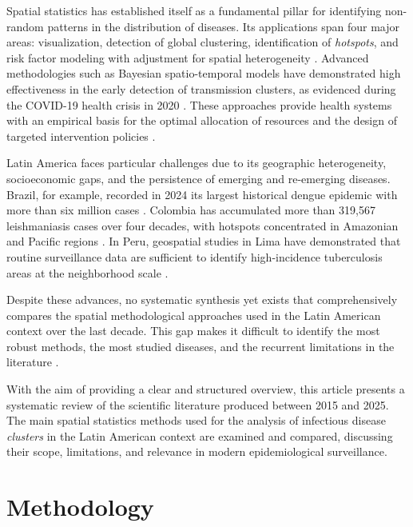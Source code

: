\documentclass[runningheads]{llncs}
\begin{document}
Spatial statistics has established itself as a fundamental
pillar for identifying non-random patterns in the distribution
of diseases. Its applications span four major areas:
visualization, detection of global clustering, identification
of \textit{hotspots}, and risk factor modeling with adjustment
for spatial heterogeneity \cite{Lin2022}. Advanced
methodologies such as Bayesian spatio-temporal models have
demonstrated high effectiveness in the early detection of
transmission clusters, as evidenced during the COVID-19
health crisis in 2020 \cite{Zhu2022,Chen2022}. These
approaches provide health systems with an empirical basis for
the optimal allocation of resources and the design of
targeted intervention policies \cite{LevinRector2024}.

Latin America faces particular challenges due to its
geographic heterogeneity, socioeconomic gaps, and the
persistence of emerging and re-emerging diseases. Brazil, for
example, recorded in 2024 its largest historical dengue
epidemic with more than six million cases \cite{Sena2025}.
Colombia has accumulated more than 319,567 leishmaniasis cases
over four decades, with hotspots concentrated in Amazonian and
Pacific regions \cite{Leishmaniasis2025}. In Peru, geospatial
studies in Lima have demonstrated that routine surveillance
data are sufficient to identify high-incidence tuberculosis
areas at the neighborhood scale \cite{Brooks2022}.

Despite these advances, no systematic synthesis yet exists
that comprehensively compares the spatial methodological
approaches used in the Latin American context over the last
decade. This gap makes it difficult to identify the most
robust methods, the most studied diseases, and the recurrent
limitations in the literature \cite{Delmelle2023,Habereder2025}.

With the aim of providing a clear and structured overview,
this article presents a systematic review of the scientific
literature produced between 2015 and 2025. The main spatial
statistics methods used for the analysis of infectious disease
\textit{clusters} in the Latin American context are examined
and compared, discussing their scope, limitations, and
relevance in modern epidemiological surveillance.

\section{Methodology}
\end{document}
